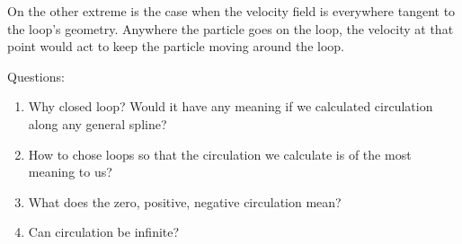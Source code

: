 On the other extreme is the case when the velocity field is everywhere tangent to the loop's geometry. Anywhere the particle goes on the loop, the velocity at that point would act to keep the particle moving around the loop.

Questions:

\begin{enumerate}
\item Why closed loop? Would it have any meaning if we calculated circulation along any general spline?

\item How to chose loops so that the circulation we calculate is of the most meaning to us?

\item What does the zero, positive, negative circulation mean?

\item Can circulation be infinite?
\end{enumerate}

